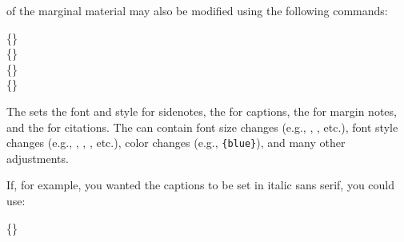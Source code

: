  of the marginal material may also be modified using the following commands:

\begin{docspec}
  \{\}\\
  \{\}\\
  \{\}\\
  \{\}
\end{docspec}

The  sets the font and style for sidenotes, the
 for captions, the  for
margin notes, and the  for citations.  The
 can contain font size changes (e.g.,
, , etc.), font style changes (e.g.,
, , , etc.), color changes (e.g.,
\texttt{\{blue\}}), and many other adjustments.

If, for example, you wanted the captions to be set in italic sans serif, you could use:
\begin{docspec}
  \{\}
\end{docspec}
